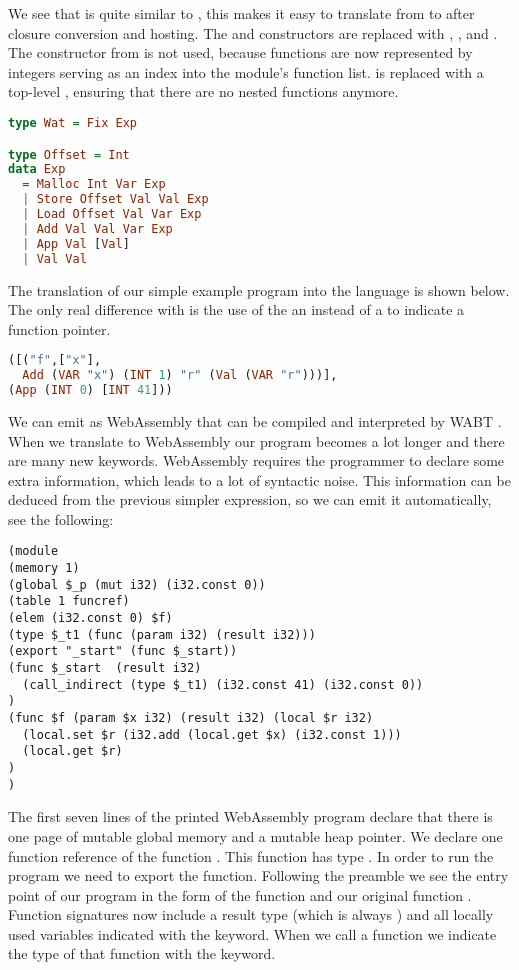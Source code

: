 {We see that  is quite similar to , this makes it easy to translate from  to  after closure conversion and hosting. The  and  constructors are replaced with , , and . The  constructor from  is not used, because functions are now represented by integers serving as an index into the module's function list.  is replaced with a top-level , ensuring that there are no nested functions anymore.

\begin{lstlisting}[language=Haskell]
type Wat = Fix Exp

type Offset = Int
data Exp
  = Malloc Int Var Exp
  | Store Offset Val Val Exp
  | Load Offset Val Var Exp
  | Add Val Val Var Exp
  | App Val [Val]
  | Val Val
\end{lstlisting}

The translation of our simple example program  into the  language is shown below. The only real difference with  is the use of the an  instead of a  to indicate a function pointer.

\begin{lstlisting}[language=Haskell]
([("f",["x"],
  Add (VAR "x") (INT 1) "r" (Val (VAR "r")))],
(App (INT 0) [INT 41]))
\end{lstlisting}

We can emit  as WebAssembly that can be compiled and interpreted by WABT \autocite{wabt}. When we translate to WebAssembly our program becomes a lot longer and there are many new keywords. WebAssembly requires the programmer to declare some extra information, which leads to a lot of syntactic noise. This information can be deduced from the previous simpler  expression, so we can emit it automatically, see the following:

\begin{lstlisting}
(module
(memory 1)
(global $_p (mut i32) (i32.const 0))
(table 1 funcref)
(elem (i32.const 0) $f)
(type $_t1 (func (param i32) (result i32)))
(export "_start" (func $_start))
(func $_start  (result i32)
  (call_indirect (type $_t1) (i32.const 41) (i32.const 0))
)
(func $f (param $x i32) (result i32) (local $r i32)
  (local.set $r (i32.add (local.get $x) (i32.const 1)))
  (local.get $r)
)
)
\end{lstlisting}

The first seven lines of the printed WebAssembly program declare that there is one page of mutable global memory and a mutable heap pointer. We declare one function reference of the function . This function has type . In order to run the program we need to export the  function. Following the preamble we see the entry point of our program in the form of the function  and our original function . Function signatures now include a result type (which is always ) and all locally used variables indicated with the  keyword. When we call a function we indicate the type of that function with the  keyword.

}
